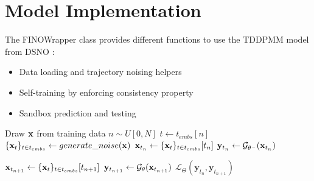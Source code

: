 \section{Model Implementation}

The FINOWrapper class provides different functions to use the TDDPMM model from DSNO :
\begin{itemize}
    \item Data loading and trajectory noising helpers
    \item Self-training by enforcing consistency property
    \item Sandbox prediction and testing
\end{itemize}


\begin{algorithm}
\caption{Training epoch of FINO}
\begin{algorithmic}
    \State Draw $\mathbf{x}$ from training data
    \State $n \sim U[0, N]$
    \State $t \gets t_{embs}[n]$
    \State $\{\mathbf{x}_t\}_{t \in t_{embs}} \gets generate\_noise(\mathbf{x})$
    \State $\mathbf{x}_{t_n} \gets \{\mathbf{x}_t\}_{t \in t_{embs}}[t_n]$
    \State $\mathbf{y}_{t_n} \gets \mathcal{G}_{\theta^-}(\mathbf{x}_{t_n})$ 

    \State $\mathbf{x}_{t_{n+1}} \gets \{\mathbf{x}_t\}_{t \in t_{embs}}[t_{n+1}]$
    \State $\mathbf{y}_{t_{n+1}} \gets \mathcal{G}_{\theta}(\mathbf{x}_{t_{n+1}})$ 
    \State $\mathcal{L}_{\Theta}(\mathbf{y}_{t_n}, \mathbf{y}_{t_{n+1}})$
    \end{algorithmic}
\end{algorithm}